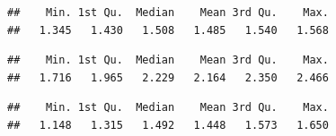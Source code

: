\documentclass[
  10pt,
  b5paper,
  oneside]{book}
\newenvironment{Shaded}{\begin{snugshade}}{\end{snugshade}}
\newcommand{\FunctionTok}[1]{\textcolor[rgb]{0.00,0.00,0.00}{#1}}
\newcommand{\NormalTok}[1]{#1}
\newcommand{\SpecialCharTok}[1]{\textcolor[rgb]{0.00,0.00,0.00}{#1}}
\begin{document}
\begin{Shaded}
\end{Shaded}

\begin{verbatim}
##    Min. 1st Qu.  Median    Mean 3rd Qu.    Max. 
##   1.345   1.430   1.508   1.485   1.540   1.568
\end{verbatim}

\begin{Shaded}
\end{Shaded}

\begin{verbatim}
##    Min. 1st Qu.  Median    Mean 3rd Qu.    Max. 
##   1.716   1.965   2.229   2.164   2.350   2.466
\end{verbatim}

\begin{Shaded}
\end{Shaded}

\begin{verbatim}
##    Min. 1st Qu.  Median    Mean 3rd Qu.    Max. 
##   1.148   1.315   1.492   1.448   1.573   1.650
\end{verbatim}
\end{document}
